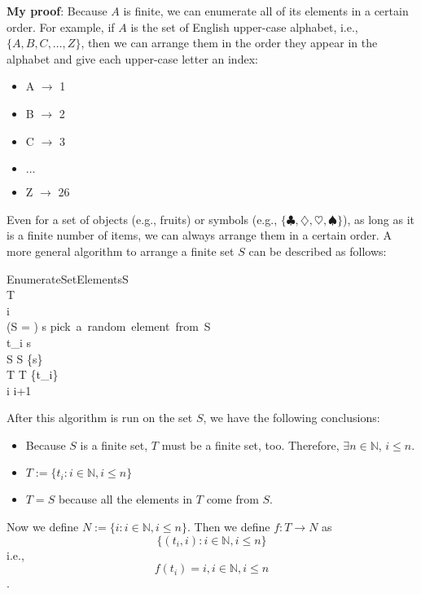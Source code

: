 \documentclass[12pt, letterpaper, oneside]{book}
\begin{document}
\colorbox{lime!100}{\textbf{My proof}}: Because $A$ is finite, we can enumerate
all of its elements in a certain order. For example, if $A$ is the set of
English upper-case alphabet, i.e., $\{A, B, C, \ldots, Z\}$, then we can arrange
them in the order they appear in the alphabet and give each upper-case letter an
index:
\begin{itemize}
  \item A $\rightarrow$ 1
  \item B $\rightarrow$ 2
  \item C $\rightarrow$ 3
  \item $\ldots$
  \item Z $\rightarrow$ 26
\end{itemize}

Even for a set of objects (e.g., fruits) or symbols (e.g., $\{\clubsuit,
  \diamondsuit, \heartsuit, \spadesuit \}$), as long as it is a finite number of
items, we can always arrange them in a certain order. A more general algorithm
to arrange a finite set $S$ can be described as follows:

\begin{pseudocode}[ruled]{EnumerateSetElements}{S}
   \\
  T \GETS \emptyset \\
  i  \\
  \WHILE \NOT (S = \emptyset) \DO
  \BEGIN
  s \GETS \mbox{pick a random element from S} \\
  t_i \GETS s \\
  S \GETS S \setminus \{s\} \\
  T \GETS T \cup \{t_i\} \\
  i \GETS i+1
  \END \\
\end{pseudocode}

After this algorithm is run on the set $S$, we have the following conclusions:
\begin{itemize}
  \item Because $S$ is a finite set, $T$ must be a finite set, too. Therefore,
        $\exists n \in \mathbb{N}$, $i \leq n$.
  \item $T:= \{t_i: i \in \mathbb{N}, i \leq n \}$
  \item $T = S$ because all the elements in $T$ come from $S$.
\end{itemize}

Now we define $N := \{i: i \in \mathbb{N}, i \leq n\}$. Then we define
$f: T \rightarrow N$ as \[\{(t_i, i): i \in \mathbb{N}, i \leq n\}\] i.e., \[
  f(t_i) = i, i \in \mathbb{N}, i \leq n\].
\end{document}
